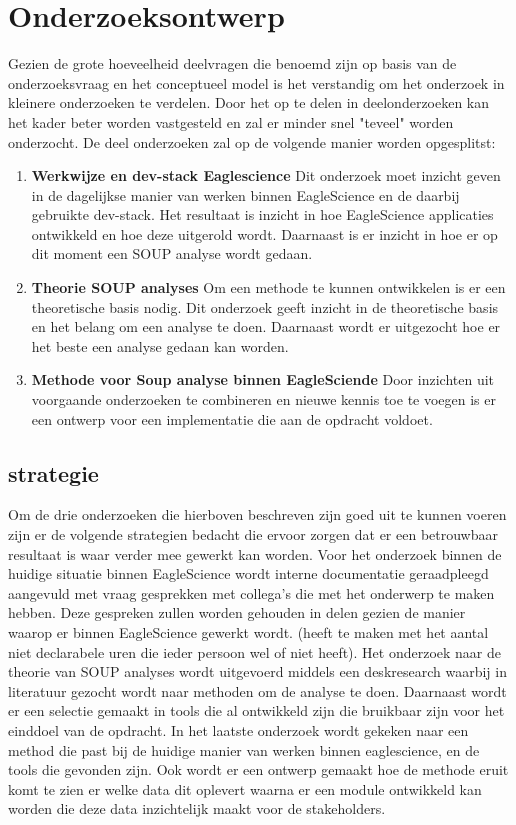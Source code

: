 \section{Onderzoeksontwerp}\label{sec:onderzoeksontwerp}
Gezien de grote hoeveelheid deelvragen die benoemd zijn op basis van de onderzoeksvraag en het conceptueel model is het verstandig om het onderzoek in kleinere onderzoeken te verdelen. Door het op te delen in deelonderzoeken kan het kader beter worden vastgesteld en zal er minder snel "teveel" worden onderzocht. De deel onderzoeken zal op de volgende manier worden opgesplitst:
\begin{enumerate}
    \item \textbf{Werkwijze en dev-stack Eaglescience} Dit onderzoek moet inzicht geven in de dagelijkse manier van werken binnen EagleScience en de daarbij gebruikte dev-stack. Het resultaat is inzicht in hoe EagleScience applicaties ontwikkeld en hoe deze uitgerold wordt. Daarnaast is er inzicht in hoe er op dit moment een SOUP analyse wordt gedaan.
    \item \textbf{Theorie SOUP analyses} Om een methode te kunnen ontwikkelen is er een theoretische basis nodig. Dit onderzoek geeft inzicht in de theoretische basis en het belang om een analyse te doen. Daarnaast wordt er uitgezocht hoe er het beste een analyse gedaan kan worden.
    \item \textbf{Methode voor Soup analyse binnen EagleSciende} Door inzichten uit voorgaande onderzoeken te combineren en nieuwe kennis toe te voegen is er een ontwerp voor een implementatie die aan de opdracht voldoet.
\end{enumerate}

\subsection{strategie}\label{subsec:opstrategie}
Om de drie onderzoeken die hierboven beschreven zijn goed uit te kunnen voeren zijn er de volgende strategien bedacht die ervoor zorgen dat er een betrouwbaar resultaat is waar verder mee gewerkt kan worden.
Voor het onderzoek binnen de huidige situatie binnen EagleScience wordt interne documentatie geraadpleegd aangevuld met vraag gesprekken met collega's die met het onderwerp te maken hebben. Deze gespreken zullen worden gehouden in delen gezien de manier waarop er binnen EagleScience gewerkt wordt. (heeft te maken met het aantal niet declarabele uren die ieder persoon wel of niet heeft). Het onderzoek naar de theorie van SOUP analyses wordt uitgevoerd middels een deskresearch waarbij in literatuur gezocht wordt naar methoden om de analyse te doen. Daarnaast wordt er een selectie gemaakt in tools die al ontwikkeld zijn die bruikbaar zijn voor het einddoel van de opdracht. In het laatste onderzoek wordt gekeken naar een method die past bij de huidige manier van werken binnen eaglescience, en de tools die gevonden zijn. Ook wordt er een ontwerp gemaakt hoe de methode eruit komt te zien er welke data dit oplevert waarna er een module ontwikkeld kan worden die deze data inzichtelijk maakt voor de stakeholders.

